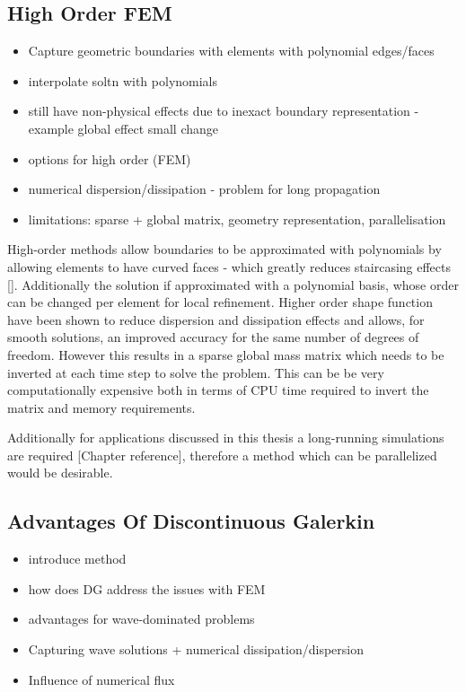 \subsection{High Order FEM}
\begin{itemize}
	\item Capture geometric boundaries with elements with polynomial edges/faces
  \item interpolate soltn with polynomials
	\item still have non-physical effects due to inexact boundary representation - example global effect small change
	\item options for high order (FEM)
  \item numerical dispersion/dissipation - problem for long propagation
  \item limitations: sparse + global matrix, geometry representation, parallelisation
\end{itemize}

High-order methods allow boundaries to be approximated with polynomials by allowing elements to have curved faces - which greatly reduces staircasing effects []. Additionally the solution if approximated with a polynomial basis, whose order can be changed per element for local refinement. Higher order shape function have been shown to reduce dispersion and dissipation effects and allows, for smooth solutions, an improved accuracy for the same number of degrees of freedom. However this results in a sparse global mass matrix which needs to be inverted at each time step to solve the problem. This can be be very computationally expensive both in terms of CPU time required to invert the matrix and memory requirements.

Additionally for applications discussed in this thesis a long-running simulations are required [Chapter reference], therefore a method which can be parallelized would be desirable.

\subsection{Advantages Of Discontinuous Galerkin}

\begin{itemize}
  \item introduce method
	\item how does DG address the issues with FEM
  \item advantages for wave-dominated problems
	\item Capturing wave solutions + numerical dissipation/dispersion
	\item Influence of numerical flux
\end{itemize}


